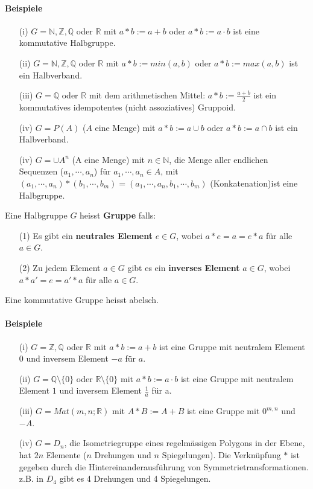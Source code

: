 \documentclass[11pt]{report}
\newcommand*\Zb[1] {\mathbb{#1}}
\newcommand*\f[1] {\textbf{#1}}
\begin{document}
\paragraph{Beispiele}
\begin{itemize}
 \item[(i)] $G = \Zb{N}, \Zb{Z}, \Zb{Q}$ oder $\Zb{R}$ mit $a*b := a+b$ oder $a*b := a \cdot b$ ist eine kommutative Halbgruppe.
 \item[(ii)] $G = \Zb{N}, \Zb{Z}, \Zb{Q}$ oder $\Zb{R}$ mit $a*b := min(a, b)$ oder $a*b := max(a, b)$ ist ein Halbverband.
 \item[(iii)] $G = \Zb{Q}$ oder $\Zb{R}$ mit dem arithmetischen Mittel: $a*b := \frac{a+b}{2}$ ist ein kommutatives idempotentes (nicht assoziatives) Gruppoid.
 \item[(iv)] $G = P(A)$ ($A$ eine Menge) mit $a*b := a \cup b$ oder $a*b := a \cap b$ ist
ein Halbverband.
 \item[(iv)] $G = \cup A^n$ (A eine Menge) mit $n \in \Zb{N}$, die Menge aller endlichen Sequenzen ($a_1, \cdots, a_n$) für $a_1, \cdots, a_n \in A$, mit $(a_1, \cdots, a_n)*(b_1, \cdots, b_m) = (a_1, \cdots, a_n, b_1, \cdots, b_m)$ (Konkatenation)ist eine Halbgruppe.
\end{itemize}
Eine Halbgruppe $G$ heisst \f{Gruppe} falls:
\begin{itemize}
 \item[(1)] Es gibt ein \f{neutrales Element} $e \in G$, wobei $a*e = a = e*a$ für alle $a \in G$.
 \item[(2)] Zu jedem Element $a \in G$ gibt es ein \f{inverses Element} $a \in G$, wobei $a*a' = e = a' * a$ für alle $a \in G$.
\end{itemize}
Eine kommutative Gruppe heisst abelsch.

\paragraph{Beispiele}
\begin{itemize}
 \item[(i)] $G = \Zb{Z}, \Zb{Q}$ oder $\Zb{R}$ mit $a * b := a + b$ ist eine Gruppe mit neutralem Element $0$ und inversem Element $-a$ für $a$. 
 \item[(ii)] $G = \Zb{Q}\setminus\{0\}$ oder $\Zb{R}\setminus\{0\}$ mit $a*b := a\cdot b$ ist eine Gruppe mit neutralem Element $1$ und inversem Element $\frac{1}{a}$ für a.
\item[(iii)] $G = Mat(m, n; \Zb{R})$ mit $A * B := A + B$ ist eine Gruppe mit $0^{m, n}$ und $-A$.
\item[(iv)] $G = D_n$, die Isometriegruppe eines regelmässigen Polygons in der Ebene, hat $2n$ Elemente ($n$ Drehungen und $n$ Spiegelungen). Die Verknüpfung $*$ ist gegeben durch die Hintereinanderausführung von Symmetrietransformationen.
z.B. in $D_4$ gibt es 4 Drehungen und 4 Spiegelungen.
\end{itemize}
\end{document}
